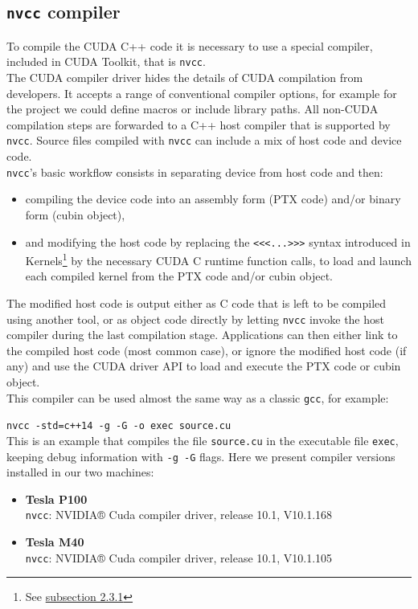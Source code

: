 \subsection{\texttt{nvcc} compiler}
	To compile the CUDA C++ code it is necessary to use a special compiler, included in CUDA Toolkit, that is \texttt{nvcc}.\\
	The CUDA compiler driver hides the details of CUDA compilation from developers. It accepts a range of conventional compiler options, for example for the project we could define macros or include library paths.
	All non-CUDA compilation steps are forwarded to a C++ host compiler that is supported by \texttt{nvcc}. 
	Source files compiled with \texttt{nvcc} can include a mix of host code and device code\cite{nvccdoc}.\\ \texttt{nvcc}'s basic workflow consists in separating device from host code and then:
	\begin{itemize}
		\item compiling the device code into an assembly form (PTX code) and/or binary form (cubin object), \item and modifying the host code by replacing the \texttt{<<<...>>>} syntax introduced in Kernels\footnote{See  \hyperref[subs:ker]{subsection 2.3.1}} by the necessary CUDA C runtime function calls, to load and launch each compiled kernel from the PTX code and/or cubin object.
	\end{itemize}
	The modified host code is output either as C code that is left to be compiled using another tool, or as object code directly by letting \texttt{nvcc} invoke the host compiler during the last compilation stage.
	Applications can then either link to the compiled host code (most common case), or ignore the modified host code (if any) and use the CUDA driver API to load and execute the PTX code or cubin object\cite{nvccdoc}.\\
	This compiler can be used almost the same way as a classic \texttt{gcc}, for example:
		
	\texttt{nvcc -std=c++14 -g -G -o exec source.cu}\\
	This is an example that compiles the file \texttt{source.cu} in the executable file \texttt{exec}, keeping debug information with \texttt{-g -G} flags.
	Here we present compiler versions installed in our two machines:	
	\begin{itemize}
		\item \textbf{Tesla P100}\\
		\texttt{nvcc}: NVIDIA® Cuda compiler driver, release 10.1, V10.1.168			
		
		\item \textbf{Tesla M40}\\
		\texttt{nvcc}: NVIDIA® Cuda compiler driver, release 10.1, V10.1.105
	\end{itemize}

